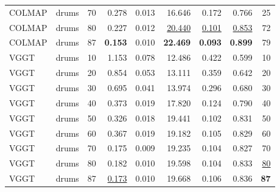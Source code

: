 \begin{table}[H]
\begin{tabular}{llrrrrrrr}
COLMAP & drums & 70 & 0.278 & 0.013 & 16.646 & 0.172 & 0.766 & 25 \\
COLMAP & drums & 80 & 0.227 & 0.012 & \underline{20.440} & \underline{0.101} & \underline{0.853} & 72 \\
COLMAP & drums & 87 & \textbf{0.153} & 0.010 & \textbf{22.469} & \textbf{0.093} & \textbf{0.899} & 79 \\
VGGT & drums & 10 & 1.153 & 0.078 & 12.486 & 0.422 & 0.599 & 10 \\
VGGT & drums & 20 & 0.854 & 0.053 & 13.111 & 0.359 & 0.642 & 20 \\
VGGT & drums & 30 & 0.695 & 0.041 & 13.974 & 0.296 & 0.680 & 30 \\
VGGT & drums & 40 & 0.373 & 0.019 & 17.820 & 0.124 & 0.790 & 40 \\
VGGT & drums & 50 & 0.326 & 0.018 & 19.441 & 0.102 & 0.831 & 50 \\
VGGT & drums & 60 & 0.367 & 0.019 & 19.182 & 0.105 & 0.829 & 60 \\
VGGT & drums & 70 & 0.175 & 0.009 & 19.235 & 0.104 & 0.827 & 70 \\
VGGT & drums & 80 & 0.182 & 0.010 & 19.598 & 0.104 & 0.833 & \underline{80} \\
VGGT & drums & 87 & \underline{0.173} & 0.010 & 19.668 & 0.106 & 0.836 & \textbf{87} \\
\bottomrule
\end{tabular}
\end{table}